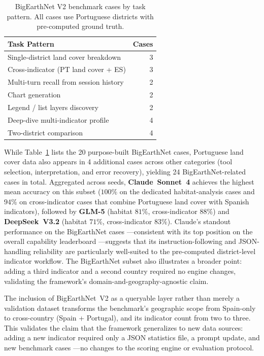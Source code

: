 \documentclass[sigconf]{acmart}
\begin{document}
\begin{table}[ht]
    \caption{BigEarthNet V2 benchmark cases by task pattern. All cases use Portuguese districts with pre-computed ground truth.}
    \label{tab:bigearth_cases}
    \centering
    \begin{tabular}{lr}
        \toprule
        \textbf{Task Pattern} & \textbf{Cases} \\
        \midrule
        Single-district land cover breakdown     & 3 \\
        Cross-indicator (PT land cover + ES)     & 3 \\
        Multi-turn recall from session history   & 2 \\
        Chart generation                         & 2 \\
        Legend / list layers discovery           & 2 \\
        Deep-dive multi-indicator profile        & 4 \\
        Two-district comparison                  & 4 \\
        \bottomrule
    \end{tabular}
\end{table}

While Table~\ref{tab:bigearth_cases} lists the 20 purpose-built BigEarthNet cases, Portuguese land cover data also appears in 4 additional cases across other categories (tool selection, interpretation, and error recovery), yielding 24 BigEarthNet-related cases in total. Aggregated across seeds, \textbf{Claude~Sonnet~4} achieves the highest mean accuracy on this subset ($100\%$ on the dedicated habitat-analysis cases and $94\%$ on cross-indicator cases that combine Portuguese land cover with Spanish indicators), followed by \textbf{GLM-5} (habitat $81\%$, cross-indicator $88\%$) and \textbf{DeepSeek~V3.2} (habitat $71\%$, cross-indicator $83\%$). Claude's standout performance on the BigEarthNet cases ---consistent with its top position on the overall capability leaderboard ---suggests that its instruction-following and JSON-handling reliability are particularly well-suited to the pre-computed district-level indicator workflow. The BigEarthNet subset also illustrates a broader point: adding a third indicator and a second country required no engine changes, validating the framework's domain-and-geography-agnostic claim.

The inclusion of BigEarthNet~V2 as a queryable layer rather than merely a validation dataset transforms the benchmark's geographic scope from Spain-only to cross-country (Spain + Portugal), and its indicator count from two to three. This validates the claim that the framework generalizes to new data sources: adding a new indicator required only a JSON statistics file, a prompt update, and new benchmark cases ---no changes to the scoring engine or evaluation protocol.
\end{document}
